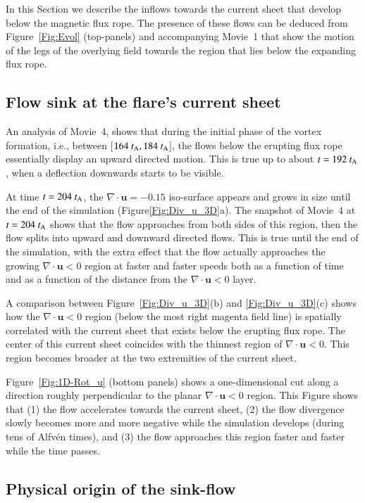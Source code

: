 \documentclass[apj]{emulateapj}
\newcommand{\tA}{t_{\rm A}}
\begin{document}
In this Section we describe the inflows towards the current sheet that develop below the magnetic flux rope. The presence of these flows can be deduced from Figure~\ref{Fig:Evol} (top-panels) and accompanying Movie~1 that show the motion of the legs of the overlying field towards the region that lies below the expanding flux rope.


\subsection{Flow sink at the flare's current sheet}

An analysis of Movie~4, shows that during the initial phase of the vortex formation, i.e., between [$164~\tA , 184~\tA$], the flows below the erupting flux rope essentially display an upward directed motion. This is true up to about $t=192~\tA$, when a deflection downwards starts to be visible.

At time $t=204~\tA$, the $\nabla \cdot \mathbf{u}=-0.15$ iso-surface appears and grows in size until the end of the simulation (Figure\ref{Fig:Div_u_3D}a). The snapshot of Movie~4 at $t=204~\tA$ shows that the flow approaches  from both sides of this region, then the flow  splits into upward and downward directed flows. This is true until the end of the simulation, with the extra effect that the flow actually approaches the growing  $\nabla \cdot \mathbf{u}<0$ region at faster and faster speeds both as a function of time and as a function of the distance from the $\nabla \cdot \mathbf{u}<0$ layer. 

A comparison between Figure~\ref{Fig:Div_u_3D}(b) and \ref{Fig:Div_u_3D}(c) shows how the  $\nabla \cdot \mathbf{u}<0$ region (below the most right magenta field line) is spatially correlated with the current sheet that exists below the erupting flux rope. The center of this current sheet coincides with the thinnest region of $\nabla \cdot \mathbf{u}<0$. This  region becomes broader at the two extremities of the current sheet.

Figure~\ref{Fig:1D-Rot_u} (bottom panels) shows a one-dimensional cut along a direction roughly perpendicular to the planar $\nabla \cdot \mathbf{u}<0$ region. This Figure shows that (1) the flow accelerates towards the current sheet, (2) the flow divergence slowly becomes more and more negative while the simulation develops (during tens of Alfv\'{e}n times), and (3) the flow approaches this region faster and faster while the time passes.

\subsection{Physical origin of the sink-flow}
\label{Sec:T-curr}
\end{document}
